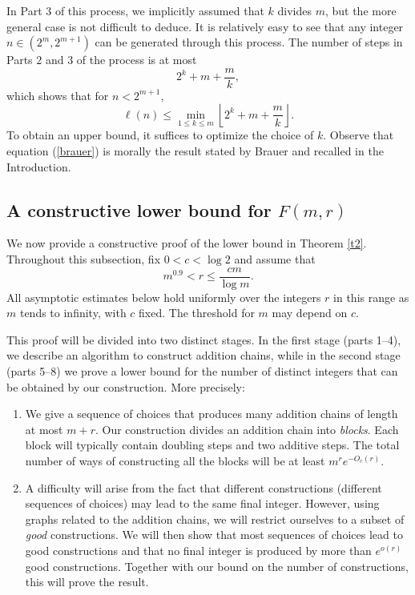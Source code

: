 \documentclass{article}
\theoremstyle{definition}
\begin{document}
In Part 3 of this process, we implicitly assumed that $k$ divides $m$, but the more general case is not difficult to deduce.  It is relatively easy to see that any integer $n\in (2^m,2^{m+1})$ can be generated through this process. The number of steps in Parts 2 and 3 of the process is at most
$$
2^{k}+m+\frac{m}{k},
$$
which shows that for $n<2^{m+1}$,
\begin{equation}\label{brauer}
\ell(n)\le \min_{1\le k \le m} \left\lfloor2^{k}+m+\frac{m}{k}\right\rfloor.
\end{equation}
To obtain an upper bound, it suffices to optimize the choice of $k$. Observe that equation (\ref{brauer}) is morally the result stated by Brauer \cite{brauer} and recalled in the Introduction.

\subsection{A constructive lower bound for \texorpdfstring{$F(m,r)$}{F(m,r)}}

We now provide a constructive proof of the lower bound in
Theorem \ref{t2}. Throughout this subsection, fix $0<c<\log 2$
and assume that
$$
m^{0.9}<r\le\frac{cm}{\log m}.
$$
All asymptotic estimates below hold uniformly over the integers
$r$ in this range as $m$ tends to infinity, with $c$ fixed. The threshold for $m$ may depend on $c$.

This proof will be divided into two distinct stages. In the first stage (parts 1--4), we describe an algorithm to construct addition chains, while in the second stage (parts 5--8) we prove a lower bound for the number of distinct integers that can be obtained by our construction. More precisely:



\begin{enumerate}
\item We give a sequence of choices that produces many addition chains of
length at most $m+r$.  
Our construction divides an addition chain into {\it blocks}. Each block will typically contain doubling steps and two additive steps.
The total number of ways of constructing all the blocks will be at least
$
 m^re^{-O_c(r)}.
$

\item A difficulty will arise from the fact that different constructions (different sequences of choices) may lead to the same final integer.
However, using graphs related to the addition chains, we will restrict ourselves to a subset of {\it good} constructions.  We will then show that most sequences of choices lead to good constructions and that no final integer is produced by more than $e^{o(r)}$ good constructions. Together with our bound on the number of constructions, this will prove the result.

\end{enumerate}
\end{document}
